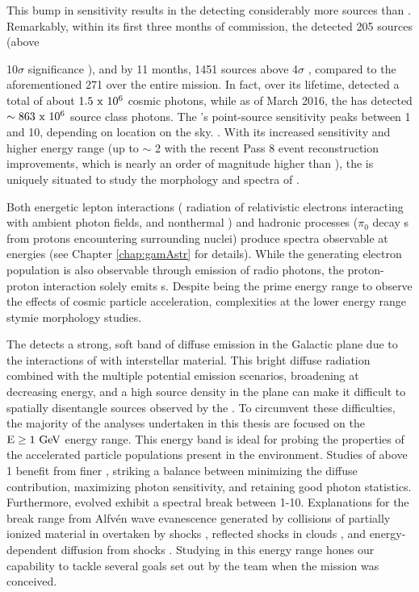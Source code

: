 This bump in sensitivity results in the \lat{} detecting considerably more sources than \egret. Remarkably, within its first three months of commission, the \lat{} detected 205 sources (above {\rm 10$\sigma$ significance \citep{lat_3m}), and by 11 months, 1451 sources above 4$\sigma$ \citep{1FGL}, compared to  the aforementioned 271 over the entire \egret{} mission. In fact, over its lifetime, \egret{} detected a total of about ${\rm 1.5~x~10^6}$ cosmic photons, while as of March 2016, the \lat{} has detected ${\rm \sim 863~x~10^6}$ source class photons. The \lat's point-source sensitivity peaks between 1 and 10\gev{}, depending on location on the sky. . With its increased sensitivity and higher energy range (up to $\sim$ 2\tev{} with the recent Pass 8 event reconstruction improvements, which is nearly an order of magnitude higher than \egret{}), the \lat{} is uniquely situated to study the \gam{} morphology and spectra of \snrs{}.

Both energetic lepton interactions (\ie \ic{} radiation of relativistic electrons interacting with ambient photon fields, and nonthermal \brems{}) and hadronic processes ($\pi_0$ decay \gam{}s from \cray{} protons encountering surrounding nuclei) produce spectra observable at \gam{} energies (see Chapter \ref{chap:gamAstr} for details). While the \ic{} generating electron population is also observable through emission of radio \sync{} photons, the proton-proton interaction solely emits \gam{}s. Despite being the prime energy range to observe the effects of cosmic particle acceleration, complexities at the lower \lat{} energy range stymie \snr{} morphology studies.

The \lat{} detects a strong, soft band of diffuse emission in the Galactic plane due to the interactions of  \crs{} with interstellar material. This bright diffuse radiation combined with the multiple potential emission scenarios, broadening \psf{} at decreasing energy, and a high source density in the plane can make it difficult to spatially disentangle sources observed by the \lat{}. To circumvent these 
difficulties, the majority of the analyses undertaken in this thesis are focused on the ${\rm E \geq 1~\mathrm{GeV}}$ energy range. This energy band is ideal for probing the properties of the accelerated particle populations present in the \snr{} environment. Studies of  \snrs{}  above 1\gev{} benefit from finer \lat{} \psf{}, striking a balance between minimizing the diffuse contribution, maximizing photon sensitivity, and retaining good photon statistics. Furthermore, evolved \snrs{}  exhibit a spectral break between 1-10\gev{}. Explanations for the break range from Alfv\' en wave evanescence generated by collisions of partially ionized material in \mcs{} overtaken by \snr{}  shocks \citep{Malkov11}, reflected shocks in clouds \cite{Inoue10c}, and energy-dependent diffusion from shocks \cite{Ohira11}. Studying \snrs{} in this energy range hones our capability to tackle several goals set out by the \Fermi{} team when the mission was conceived.

}
